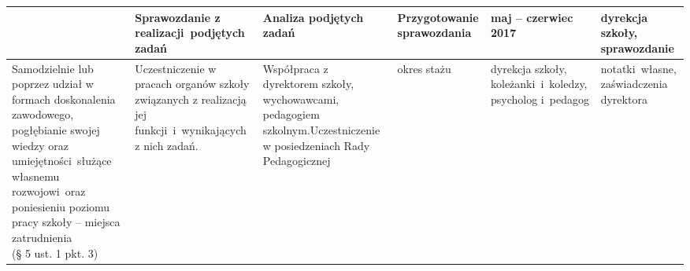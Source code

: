 \documentclass[a4paper,titlepage,13pt,draft]{mwart}
\begin{document}
\begin{tabular}{ | p{2.4cm} | p{2.5cm} | p{5cm} | p{1.4cm} | p{2cm} | p{2.1cm} |}
&Sprawozdanie z realizacji~podjętych zadań&Analiza podjętych zadań&Przygotowanie sprawozdania&maj -- czerwiec 2017&dyrekcja szkoły, sprawozdanie\\ \hline
\multiline{Samodzielnie lub poprzez udział w formach doskonalenia zawodowego, pogłębianie swojej wiedzy oraz umiejętności~służące własnemu rozwojowi~oraz poniesieniu poziomu pracy szkoły -- miejsca zatrudnienia\newline
(§ 5 ust. 1 pkt. 3)}&Uczestniczenie w pracach organów szkoły związanych z realizacją jej funkcji~i~wynikających z nich zadań.&Współpraca z dyrektorem szkoły, wychowawcami, pedagogiem szkolnym.\newline Uczestniczenie w posiedzeniach Rady Pedagogicznej&okres stażu&dyrekcja szkoły, koleżanki~i~koledzy, psycholog i~pedagog&notatki~własne, zaświadczenia dyrektora\\ \hline
\end{tabular}
\newpage
\end{document}
